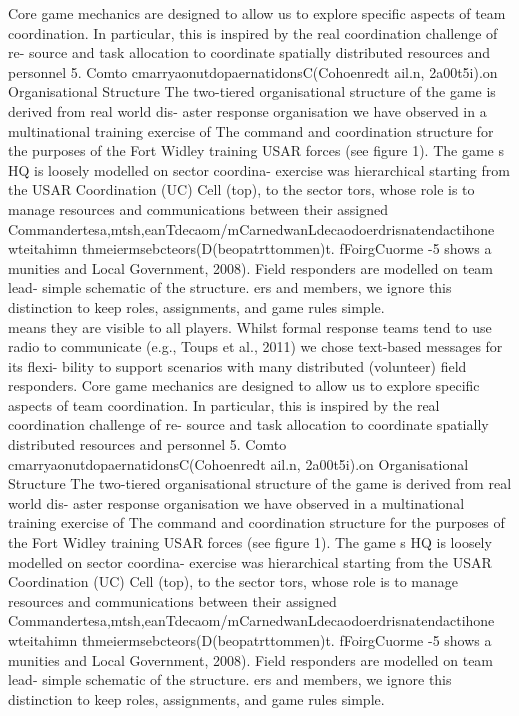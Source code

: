 Core game mechanics are designed to allow us to explore specific aspects of team coordination. In particular, this is inspired by the real coordination challenge of re- source and task allocation to coordinate spatially distributed resources and personnel
5. Comto cmarryaonutdopaernatidonsC(Cohoenredt ail.n, 2a00t5i).on Organisational Structure
The two-tiered organisational structure of the game is derived from real world dis-
aster response organisation we have observed in a multinational training exercise of
The command and coordination structure for the purposes of the Fort Widley training
USAR forces (see figure 1). The game s HQ is loosely modelled on sector coordina-
exercise was hierarchical starting from the USAR Coordination (UC) Cell (top), to the sector
tors, whose role is to manage resources and communications between their assigned Commandertesa,mtsh,eanTdecaom/mCarnedwanLdecaodoerdrisnatendactihone wteitahimn thmeiermsebcteors(D(beopatrttommen)t. fFoirgCuorme -5 shows a
munities and Local Government, 2008). Field responders are modelled on team lead-
simple schematic of the structure.
ers and members, we ignore this distinction to keep roles, assignments, and game rules simple.\\

means they are visible to all players. Whilst formal response teams tend to use radio to communicate (e.g., Toups et al., 2011) we chose text-based messages for its flexi- bility to support scenarios with many distributed (volunteer) field responders.
Core game mechanics are designed to allow us to explore specific aspects of team coordination. In particular, this is inspired by the real coordination challenge of re- source and task allocation to coordinate spatially distributed resources and personnel
5. Comto cmarryaonutdopaernatidonsC(Cohoenredt ail.n, 2a00t5i).on Organisational Structure
The two-tiered organisational structure of the game is derived from real world dis-
aster response organisation we have observed in a multinational training exercise of
The command and coordination structure for the purposes of the Fort Widley training
USAR forces (see figure 1). The game s HQ is loosely modelled on sector coordina-
exercise was hierarchical starting from the USAR Coordination (UC) Cell (top), to the sector
tors, whose role is to manage resources and communications between their assigned Commandertesa,mtsh,eanTdecaom/mCarnedwanLdecaodoerdrisnatendactihone wteitahimn thmeiermsebcteors(D(beopatrttommen)t. fFoirgCuorme -5 shows a
munities and Local Government, 2008). Field responders are modelled on team lead-
simple schematic of the structure.
ers and members, we ignore this distinction to keep roles, assignments, and game rules simple.\\

